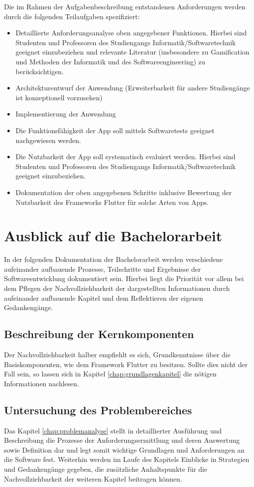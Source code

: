 \documentclass[bibliography=totoc,listof=totoc,BCOR=5mm,DIV=12,oneside]{scrbook}
\begin{document}
Die im Rahmen der Aufgabenbeschreibung entstandenen Anforderungen werden durch die folgenden Teilaufgaben spezifiziert:
\begin{itemize}
\item Detaillierte Anforderungsanalyse oben angegebener Funktionen. Hierbei sind Studenten und Professoren des Studiengangs Informatik/Softwaretechnik geeignet einzubeziehen und relevante Literatur (insbesondere zu Gamification und Methoden der Informatik und des Softwareengineering) zu berücksichtigen.
\item Architekturentwurf der Anwendung (Erweiterbarkeit für andere Studiengänge ist konzeptionell vorzusehen)
\item Implementierung der Anwendung
\item Die Funktionsfähigkeit der App soll mittels Softwaretests geeignet nachgewiesen werden.
\item Die Nutzbarkeit der App soll systematisch evaluiert werden. Hierbei sind Studenten und Professoren des Studiengangs Informatik/Softwaretechnik geeignet einzubeziehen.
\item Dokumentation der oben angegebenen Schritte inklusive Bewertung der Nutzbarkeit des Frameworks Flutter für solche Arten von Apps.
\end{itemize}

\section{Ausblick auf die Bachelorarbeit}
\par In der folgenden Dokumentation der Bachelorarbeit werden verschiedene aufeinander aufbauende Prozesse, Teilschritte und Ergebnisse der Softwareentwicklung dokumentiert sein. Hierbei liegt die Priorität vor allem bei dem Pflegen der Nachvollziehbarkeit der dargestellten Informationen durch aufeinander aufbauende Kapitel und dem Reflektieren der eigenen Gedankengänge.

\subsection{Beschreibung der Kernkomponenten}
\par Der Nachvollziehbarkeit halber empfiehlt es sich, Grundkenntnisse über die Basiskomponenten, wie dem Framework Flutter zu besitzen. Sollte dies nicht der Fall sein, so lassen sich in Kapitel \ref{chap:grundlagenkapitel} die nötigen Informationen nachlesen.

\subsection{Untersuchung des Problembereiches}
\par Das Kapitel \ref{chap:problemanalyse} stellt in detaillierter Ausführung und Beschreibung die Prozesse der Anforderungsermittlung und deren Auswertung sowie Definition dar und legt somit wichtige Grundlagen und Anforderungen an die Software fest. Weiterhin werden im Laufe des Kapitels Einblicke in Strategien und Gedankengänge gegeben, die zusätzliche Anhaltspunkte für die Nachvollziehbarkeit der weiteren Kapitel beitragen können.
\end{document}

